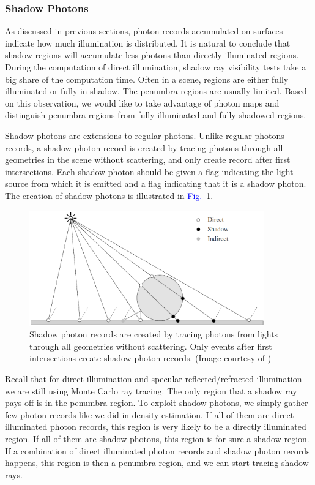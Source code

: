 \documentclass[]{book}
\renewcommand{\figurename}{\textcolor{blue}{Fig.\ }}
\begin{document}
\subsubsection*{Shadow Photons}
As discussed in previous sections, photon records accumulated on surfaces indicate how much illumination is distributed.
It is natural to conclude that shadow regions will accumulate less photons than directly illuminated regions.
During the computation of direct illumination, shadow ray visibility tests take a big share of the computation time.
Often in a scene, regions are either fully illuminated or fully in shadow.
The penumbra regions are usually limited.
Based on this observation, we would like to take advantage of photon maps and distinguish penumbra regions from fully illuminated and fully shadowed regions.

Shadow photons are extensions to regular photons.
Unlike regular photons records, a shadow photon record is created by tracing photons through all geometries in the scene without scattering, and only create record after first intersections.
Each shadow photon should be given a flag indicating the light source from which it is emitted and a flag indicating that it is a shadow photon.
The creation of shadow photons is illustrated in \figurename \ref{fig:PM:shadowPhoton}.

\begin{figure}
	\centering
	\includegraphics[width=4.0in]{img/PM-shadowPhoton.png}
	\caption[Shadow Photon Creation]{Shadow photon records are created by tracing photons from lights through all geometries without scattering. Only events after first intersections create shadow photon records. (Image courtesy of \citeauthor{jensen1995photon})}
	\label{fig:PM:shadowPhoton}
\end{figure}

Recall that for direct illumination and specular-reflected/refracted illumination we are still using Monte Carlo ray tracing.
The only region that a shadow ray pays off is in the penumbra region.
To exploit shadow photons, we simply gather few photon records like we did in density estimation.
If all of them are direct illuminated photon records, this region is very likely to be a directly illuminated region.
If all of them are shadow photons, this region is for sure a shadow region.
If a combination of direct illuminated photon records and shadow photon records happens, this region is then a penumbra region, and we can start tracing shadow rays.
\end{document}
